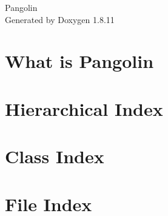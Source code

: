 \documentclass[twoside]{book}
\newcommand{\+}{\discretionary{\mbox{\scriptsize$\hookleftarrow$}}{}{}}
\newcommand{\clearemptydoublepage}{%
  \newpage{\pagestyle{empty}\cleardoublepage}%
}
\begin{document}
\hypersetup{pageanchor=false,
             bookmarksnumbered=true,
             pdfencoding=unicode
            }
\begin{titlepage}
\vspace*{7cm}
\begin{center}%
{\Large Pangolin }\\
\vspace*{1cm}
{\large Generated by Doxygen 1.8.11}\\
\end{center}
\end{titlepage}
\clearemptydoublepage
\tableofcontents
\clearemptydoublepage
{}
\hypersetup{pageanchor=true}

\chapter{What is Pangolin}
\label{index}\hypertarget{index}{}
\chapter{Hierarchical Index}

\chapter{Class Index}

\chapter{File Index}

\end{document}
